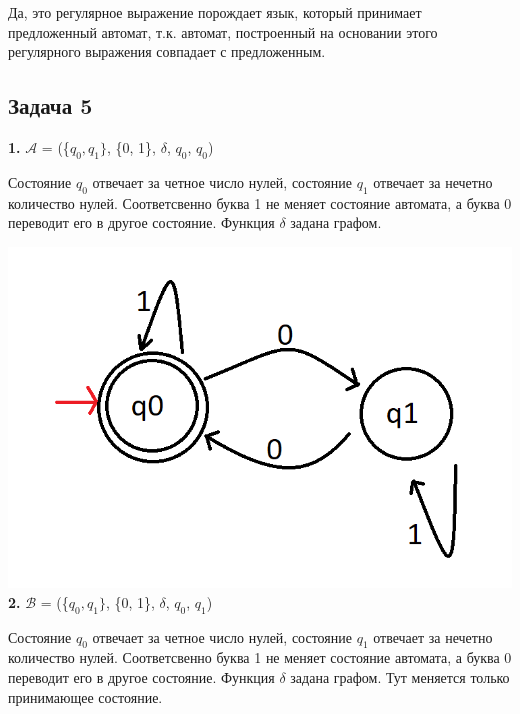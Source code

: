 \documentclass[a4paper,14pt]{article} %
\begin{document}
Да, это регулярное выражение порождает язык, который принимает предложенный автомат, т.к. автомат, построенный на основании этого регулярного выражения совпадает с предложенным.

\subsection{Задача 5}

\textbf{1.}
$\mathcal{A}$ = (\{$q_0, q_1\}$, \{0, 1\}, $\delta$, $q_0$, $q_0$)

Состояние $q_0$ отвечает за четное число нулей, состояние $q_1$ отвечает за нечетно количество нулей. Соответсвенно буква 1 не меняет состояние автомата, а буква 0 переводит его в другое состояние. Функция $\delta$ задана графом.

\includegraphics[scale=0.5]{03.png}
\newline
\textbf{2.}
$\mathcal{B}$ = (\{$q_0, q_1\}$, \{0, 1\}, $\delta$, $q_0$, $q_1$)

Состояние $q_0$ отвечает за четное число нулей, состояние $q_1$ отвечает за нечетно количество нулей. Соответсвенно буква 1 не меняет состояние автомата, а буква 0 переводит его в другое состояние. Функция $\delta$ задана графом.
Тут меняется только принимающее состояние.
\end{document}
